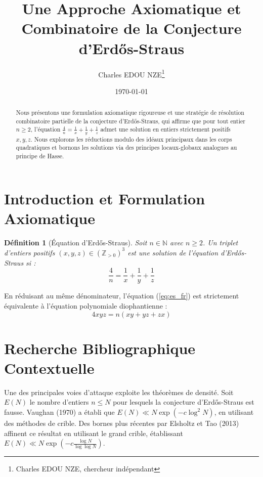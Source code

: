 \documentclass[12pt,a4paper]{article}
\title{Une Approche Axiomatique et Combinatoire de la Conjecture d'Erdős-Straus}
\author{Charles EDOU NZE\thanks{Charles EDOU NZE, chercheur indépendant}}
\date{\today}
\newtheorem{definition}{Définition}
\begin{document}
\maketitle

\begin{abstract}
Nous présentons une formulation axiomatique rigoureuse et une stratégie de résolution combinatoire partielle de la conjecture d'Erdős-Straus, qui affirme que pour tout entier $n \geq 2$, l'équation $\frac{4}{n} = \frac{1}{x} + \frac{1}{y} + \frac{1}{z}$ admet une solution en entiers strictement positifs $x, y, z$. Nous explorons les réductions modulo des idéaux principaux dans les corps quadratiques et bornons les solutions via des principes locaux-globaux analogues au principe de Hasse.
\end{abstract}

\section{Introduction et Formulation Axiomatique}

\begin{definition}[Équation d'Erdős-Straus]
Soit $n \in \mathbb{N}$ avec $n \geq 2$. Un triplet d'entiers positifs $(x,y,z) \in (\mathbb{Z}_{>0})^3$ est une solution de l'équation d'Erdős-Straus si :
\begin{equation}
\label{eq:es_fr}
\frac{4}{n} = \frac{1}{x} + \frac{1}{y} + \frac{1}{z}
\end{equation}
\end{definition}

En réduisant au même dénominateur, l'équation (\ref{eq:es_fr}) est strictement équivalente à l'équation polynomiale diophantienne :
\begin{equation}
4xyz = n(xy + yz + zx)
\end{equation}

\section{Recherche Bibliographique Contextuelle}
Une des principales voies d'attaque exploite les théorèmes de densité. Soit $E(N)$ le nombre d'entiers $n \leq N$ pour lesquels la conjecture d'Erdős-Straus est fausse. Vaughan (1970) a établi que $E(N) \ll N \exp(-c \log^2 N)$, en utilisant des méthodes de crible. Des bornes plus récentes par Elsholtz et Tao (2013) affinent ce résultat en utilisant le grand crible, établissant $E(N) \ll N \exp(-c \frac{\log N}{\log \log N})$.
\end{document}
